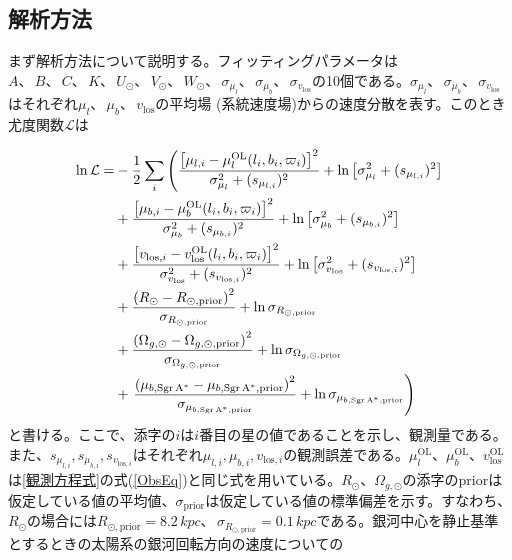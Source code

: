 \subsection{解析方法}
まず解析方法について説明する。フィッティングパラメータは$A、\,B、\,C、\,K、\,U_{\odot}、\,V_{\odot}、\,W_{\odot}、\,\sigma_{\mu_l}、\,\sigma_{\mu_b}、\,\sigma_{v_{\mathrm{los}}}$の10個である。$\sigma_{\mu_l}、\,\sigma_{\mu_b}、\,\sigma_{v_{\mathrm{los}}}$はそれぞれ$\mu_l、\,\mu_b、\,v_{\mathrm{los}}$の平均場 (系統速度場)からの速度分散を表す。このとき尤度関数$\mathcal{L}$は
\newpage

\newpage
\begin{align}
\begin{aligned}
	\ln \mathcal{L} =& -\frac{1}{2}\sum_i \left(\frac{\left[\mu_{l,i} - \mu_l^{\mathrm{OL}}(l_i,b_i,\varpi_i)\right]^2}{\sigma_{\mu_l}^2 + (s_{\mu_{l,i}})^2}  + {\rm ln}\left[\sigma_{\mu_l}^2 + (s_{\mu_{l,i}})^2\right] \right. \\
	&+ \frac{\left[\mu_{b,i} - \mu_b^{\mathrm{OL}}(l_i,b_i,\varpi_i)\right]^2}{\sigma_{\mu_b}^2 + (s_{\mu_{b,i}})^2}  + {\rm ln}\left[\sigma_{\mu_b}^2 + (s_{\mu_{b,i}})^2\right] \\
	&+ \frac{\left[v_{\mathrm{los},i} - v^{\mathrm{OL}}_{\mathrm{los}}(l_i,b_i,\varpi_i)\right]^2}{\sigma_{v_{\mathrm{los}}}^2 + (s_{v_{\mathrm{los},i}})^2} + {\rm ln}\left[\sigma_{v_{\mathrm{los}}}^2 + (s_{v_{\mathrm{los},i}})^2\right]\\
	&+ \frac{\left(R_{\odot} - R_{\odot,\mathrm{prior}}\right)^2}{\sigma_{R_{\odot,\mathrm{prior}}}} + \ln{\sigma_{R_{\odot,\mathrm{prior}}}}\\
	&+ \frac{\left(\Omega_{g,\odot} - \Omega_{g,\odot,\mathrm{prior}}\right)^2}{\sigma_{\Omega_{g,\odot,\mathrm{prior}}}} + \ln{\sigma_{\Omega_{g,\odot,\mathrm{prior}}}}\\ 
	&+ \left. \frac{\left(\mu_{b,\mathrm{Sgr\,A}^*} - \mu_{b,\mathrm{Sgr\,A}^*,\mathrm{prior}}\right)^2}{\sigma_{\mu_{b,\mathrm{Sgr\,A}^*,\mathrm{prior}}}} + \ln{\sigma_{\mu_{b,\mathrm{Sgr\,A}^*,\mathrm{prior}}}}\right)
\end{aligned}
\end{align}
と書ける。ここで、添字の$i$は$i$番目の星の値であることを示し、観測量である。また、$s_{\mu_{l,i}},s_{\mu_{b,i}},s_{v_{\mathrm{los},i}}$はそれぞれ$\mu_{l,i},\mu_{b,i},v_{\mathrm{los},i}$の観測誤差である。$\mu_l^{\mathrm{OL}}、\mu_b^{\mathrm{OL}}、v^{\mathrm{OL}}_{\mathrm{los}}$は\ref{観測方程式}の式(\ref{ObsEq})と同じ式を用いている。$R_{\odot}、\Omega_{g,\odot}$の添字のpriorは仮定している値の平均値、$\sigma_{\mathrm{prior}}$は仮定している値の標準偏差を示す。すなわち、$R_{\odot}$の場合には$R_{\odot,\mathrm{prior}} = 8.2\,\si{kpc}、\,\sigma_{R_{\odot,\mathrm{prior}}}=0.1\,\si{kpc}$である。銀河中心を静止基準とするときの太陽系の銀河回転方向の速度についての
